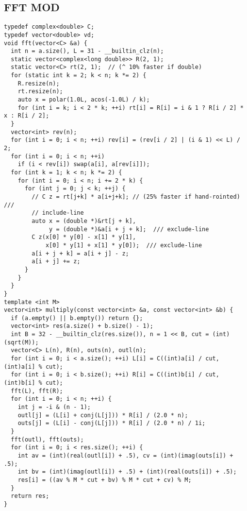 \documentclass[twoside]{article}
\begin{document}
\begin{multicols*}{2}
{\subsection*{FFT MOD}
}
\begin{verbatim}
typedef complex<double> C;
typedef vector<double> vd;
void fft(vector<C> &a) {
  int n = a.size(), L = 31 - __builtin_clz(n);
  static vector<complex<long double>> R(2, 1);
  static vector<C> rt(2, 1);  // (^ 10% faster if double)
  for (static int k = 2; k < n; k *= 2) {
    R.resize(n);
    rt.resize(n);
    auto x = polar(1.0L, acos(-1.0L) / k);
    for (int i = k; i < 2 * k; ++i) rt[i] = R[i] = i & 1 ? R[i / 2] * x : R[i / 2];
  }
  vector<int> rev(n);
  for (int i = 0; i < n; ++i) rev[i] = (rev[i / 2] | (i & 1) << L) / 2;
  for (int i = 0; i < n; ++i)
    if (i < rev[i]) swap(a[i], a[rev[i]]);
  for (int k = 1; k < n; k *= 2) {
    for (int i = 0; i < n; i += 2 * k) {
      for (int j = 0; j < k; ++j) {
        // C z = rt[j+k] * a[i+j+k]; // (25% faster if hand-rointed)  ///
        // include-line
        auto x = (double *)&rt[j + k],
             y = (double *)&a[i + j + k];  /// exclude-line
        C z(x[0] * y[0] - x[1] * y[1],
            x[0] * y[1] + x[1] * y[0]);  /// exclude-line
        a[i + j + k] = a[i + j] - z;
        a[i + j] += z;
      }
    }
  }
}
template <int M>
vector<int> multiply(const vector<int> &a, const vector<int> &b) {
  if (a.empty() || b.empty()) return {};
  vector<int> res(a.size() + b.size() - 1);
  int B = 32 - __builtin_clz(res.size()), n = 1 << B, cut = (int)(sqrt(M));
  vector<C> L(n), R(n), outs(n), outl(n);
  for (int i = 0; i < a.size(); ++i) L[i] = C((int)a[i] / cut, (int)a[i] % cut);
  for (int i = 0; i < b.size(); ++i) R[i] = C((int)b[i] / cut, (int)b[i] % cut);
  fft(L), fft(R);
  for (int i = 0; i < n; ++i) {
    int j = -i & (n - 1);
    outl[j] = (L[i] + conj(L[j])) * R[i] / (2.0 * n);
    outs[j] = (L[i] - conj(L[j])) * R[i] / (2.0 * n) / 1i;
  }
  fft(outl), fft(outs);
  for (int i = 0; i < res.size(); ++i) {
    int av = (int)(real(outl[i]) + .5), cv = (int)(imag(outs[i]) + .5);
    int bv = (int)(imag(outl[i]) + .5) + (int)(real(outs[i]) + .5);
    res[i] = ((av % M * cut + bv) % M * cut + cv) % M;
  }
  return res;
}
\end{verbatim}

{
}
\end{multicols*}
\end{document}
